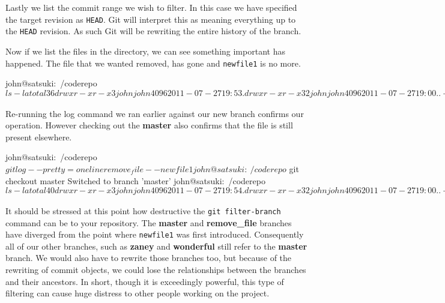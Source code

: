 {Lastly we list the commit range we wish to filter.
In this case we have specified the target revision as \texttt{HEAD}.
Git will interpret this as meaning everything up to the \texttt{HEAD} revision.
As such Git will be rewriting the entire history of the branch.

Now if we list the files in the directory, we can see something important has happened.
The file that we wanted removed, has gone and \texttt{newfile1} is no more.

\begin{code}
john@satsuki:~/coderepo$ ls -la
total 36
drwxr-xr-x  3 john john 4096 2011-07-27 19:53 .
drwxr-xr-x 32 john john 4096 2011-07-27 19:00 ..
-rw-r--r--  1 john john   35 2011-07-22 07:15 another_file
-rw-r--r--  1 john john   25 2011-07-22 07:15 cont_dev
drwxrwxr-x  9 john john 4096 2011-07-27 19:53 .git
-rw-r--r--  1 john john   58 2011-07-22 07:15 newfile2
-rw-r--r--  1 john john   45 2011-07-22 07:15 newfile3
-rw-r--r--  1 john john    8 2011-03-31 22:15 temp_file
-rwxrwxr-x  1 john john  114 2011-07-21 21:17 test.sh
john@satsuki:~/coderepo$
\end{code}

Re-running the log command we ran earlier against our new branch confirms our operation.
However checking out the \textbf{master} also confirms that the file is still present elsewhere.

\begin{code}
john@satsuki:~/coderepo$ git log --pretty=oneline remove_file -- newfile1
john@satsuki:~/coderepo$ git checkout master
Switched to branch 'master'
john@satsuki:~/coderepo$ ls -la
total 40
drwxr-xr-x  3 john john 4096 2011-07-27 19:54 .
drwxr-xr-x 32 john john 4096 2011-07-27 19:00 ..
-rw-r--r--  1 john john   35 2011-07-22 07:15 another_file
-rw-r--r--  1 john john   25 2011-07-22 07:15 cont_dev
drwxrwxr-x  9 john john 4096 2011-07-27 19:54 .git
-rw-r--r--  1 john john   69 2011-07-27 19:54 newfile1
-rw-r--r--  1 john john   58 2011-07-22 07:15 newfile2
-rw-r--r--  1 john john   45 2011-07-22 07:15 newfile3
-rw-r--r--  1 john john    8 2011-03-31 22:15 temp_file
-rwxrwxr-x  1 john john  114 2011-07-21 21:17 test.sh
john@satsuki:~/coderepo$
\end{code}

It should be stressed at this point how destructive the \texttt{git filter-branch} command can be to your repository.
The \textbf{master} and \textbf{remove\_file} branches have diverged from the point where \texttt{newfile1} was first introduced.
Consequently all of our other branches, such as \textbf{zaney} and \textbf{wonderful} still refer to the \textbf{master} branch.
We would also have to rewrite those branches too, but because of the rewriting of commit objects, we could lose the relationships between the branches and their ancestors.
In short, though it is exceedingly powerful, this type of filtering can cause huge distress to other people working on the project.

}
